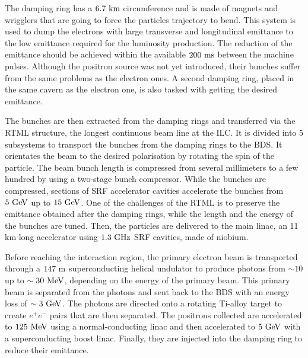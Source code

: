     The damping ring has a $6.7~\rm{km}$ circumference and is made of magnets and wrigglers that are going to force the particles trajectory to bend.
    This system is used to dump the electrons with large transverse and longitudinal emittance to the low emittance required for the luminosity production.
    The reduction of the emittance should be achieved within the available $200~\rm{ms}$ between the machine pulses.
    Although the positron source was not yet introduced, their bunches suffer from the same problems as the electron ones. 
    A second damping ring, placed in the same cavern as the electron one, is also tasked with getting the desired emittance.

    The bunches are then extracted from the damping rings and transferred via the \gls{RTML} structure, the longest continuous beam line at the \gls{ILC}.
    It is divided into 5 subsystems to transport the bunches from the damping rings to the \gls{BDS}.
    It orientates the beam to the desired polarisation by rotating the spin of the particle.
    The beam bunch length is compressed  from several millimeters to a few hundred by using a two-stage bunch compressor.
    While the bunches are compressed, sections of \gls{SRF} accelerator cavities  accelerate the bunches from $5~\rm{GeV}$ up to $15~\rm{GeV}$.
    One of the challenges of the \gls{RTML} is to preserve the emittance obtained after the damping rings, while the length and the energy of the bunches are tuned.
    Then, the particles are delivered to the main linac, an 11 km long accelerator using $1.3~\rm{GHz}$ \gls{SRF} cavities, made of niobium.

    Before reaching the interaction region, the primary electron beam is transported through a $147~\rm{m}$ superconducting helical undulator to produce photons from $\sim 10$ up to $\sim 30~\rm{MeV}$, depending on the energy of the primary beam.
    This primary beam is separated from the photons and sent back to the \gls{BDS} with an energy loss of $\sim 3~\rm{GeV}$.
    The photons are directed onto a rotating Ti-alloy target to create $e^+e^-$ pairs that are then separated.
    The positrons collected are accelerated to $125~\rm{MeV}$ using a normal-conducting linac and then accelerated to $5~\rm{GeV}$ with a superconducting boost linac.
    Finally, they are injected into the damping ring to reduce their emittance.

